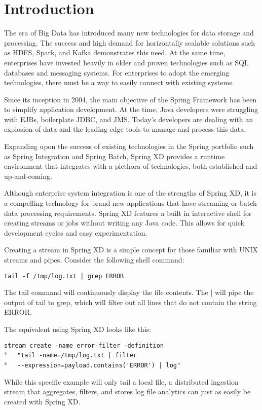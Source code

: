 \section{Introduction}

The era of Big Data has introduced many new technologies for data storage
and processing. The success and high demand for horizontally scalable
solutions such as HDFS, Spark, and Kafka demonstrates this need. At the
same time, enterprises have invested heavily in older and proven
technologies such as SQL databases and messaging systems. For enterprises
to adopt the emerging technologies, there must be a way to easily
connect with existing systems.

Since its inception in 2004, the main objective of the Spring Framework
has been to simplify application development. At the time, Java developers
were struggling with EJBs, boilerplate JDBC, and JMS. Today's developers
are dealing with an explosion of data and the leading-edge tools to
manage and process this data.

Expanding upon the success of existing technologies in the Spring portfolio
such as Spring Integration and Spring Batch, Spring XD provides a runtime
environment that integrates with a plethora of technologies, both established
and up-and-coming.

Although enterprise system integration is one of the strengths of Spring XD,
it is a compelling technology for brand new applications that have streaming
or batch data processing requirements. Spring XD features a built in
interactive shell for creating streams or jobs without writing any Java code.
This allows for quick development cycles and easy experimentation.

Creating a stream in Spring XD is a simple concept for those familiar with
UNIX streams and pipes. Consider the following shell command:

\verb;tail -f /tmp/log.txt | grep ERROR;

The tail command will continuously display the file contents. The |
will pipe the output of tail to grep, which will filter out all
lines that do not contain the string ERROR.

The equivalent using Spring XD looks like this:

\verb;stream create -name error-filter -definition;\\*
\verb;  "tail -name=/tmp/log.txt | filter;\\*
\verb;  --expression=payload.contains('ERROR') | log";

While this specific example will only tail a local file, a distributed 
ingestion stream that aggregates, filters, and stores log file analytics
can just as easily be created with Spring XD.
